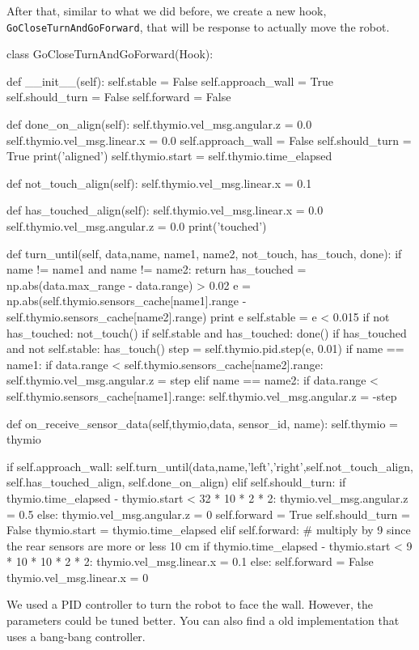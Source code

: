 \documentclass[11pt]{article}
\begin{document}
After that, similar to what we did before, we create a new hook, \texttt{GoCloseTurnAndGoForward}, that will be response to actually move the robot.

\begin{python}
class GoCloseTurnAndGoForward(Hook):

    def __init__(self):
        self.stable = False
        self.approach_wall = True
        self.should_turn = False
        self.forward = False

    def done_on_align(self):
        self.thymio.vel_msg.angular.z = 0.0
        self.thymio.vel_msg.linear.x = 0.0
        self.approach_wall = False
        self.should_turn = True 
        print('aligned')
        self.thymio.start = self.thymio.time_elapsed

    def not_touch_align(self):
        self.thymio.vel_msg.linear.x = 0.1

    def has_touched_align(self):
        self.thymio.vel_msg.linear.x = 0.0
        self.thymio.vel_msg.angular.z = 0.0
        print('touched')
        
    def turn_until(self, data,name,  name1, name2, not_touch, has_touch, done):
        if name != name1 and name != name2: return 
        has_touched = np.abs(data.max_range - data.range) > 0.02
        e = np.abs(self.thymio.sensors_cache[name1].range -  self.thymio.sensors_cache[name2].range)
        print  e
        self.stable = e < 0.015
        if not has_touched:
            not_touch()
        if self.stable and has_touched:
            done()
        if has_touched and not self.stable:
            has_touch()
            step = self.thymio.pid.step(e, 0.01)
            if name == name1:
                if  data.range < self.thymio.sensors_cache[name2].range:
                    self.thymio.vel_msg.angular.z = step
            elif name == name2:
                if  data.range < self.thymio.sensors_cache[name1].range:
                    self.thymio.vel_msg.angular.z = -step

    def on_receive_sensor_data(self,thymio,data, sensor_id, name):
        self.thymio = thymio

        if self.approach_wall:
            self.turn_until(data,name,'left','right',self.not_touch_align, self.has_touched_align, self.done_on_align)
        elif self.should_turn:
            if thymio.time_elapsed - thymio.start <  32 * 10 * 2 * 2:
                thymio.vel_msg.angular.z = 0.5
            else: 
                thymio.vel_msg.angular.z = 0
                self.forward = True
                self.should_turn = False
                thymio.start = thymio.time_elapsed 
        elif self.forward:
            # multiply by 9 since the rear sensors are more or less 10 cm
            if thymio.time_elapsed - thymio.start <  9 * 10 *  10 * 2 * 2:
                thymio.vel_msg.linear.x = 0.1
            else: 
                self.forward = False
                thymio.vel_msg.linear.x = 0

\end{python}
We used a PID controller to turn the robot to face the wall. However, the parameters could be tuned better. You can also find a old implementation that uses a bang-bang controller.
\end{document}

